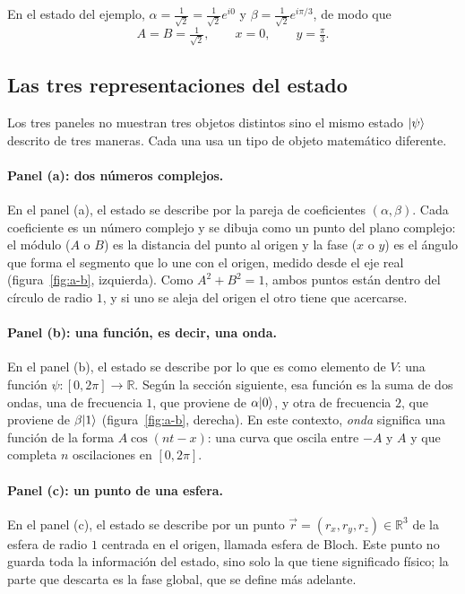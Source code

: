En el estado del ejemplo, $\alpha=\frac1{\sqrt2}=\frac1{\sqrt2}e^{i0}$ y
$\beta=\frac1{\sqrt2}e^{i\pi/3}$, de modo que
\[
  A=B=\tfrac1{\sqrt2},\qquad x=0,\qquad y=\tfrac\pi3 .
\]

\subsection*{Las tres representaciones del estado}

Los tres paneles no muestran tres objetos distintos sino el mismo estado $\lvert \psi\rangle$ descrito de
tres maneras. Cada una usa un tipo de objeto matemático diferente.

\paragraph{Panel (a): dos números complejos.}
En el panel (a), el estado se describe por la pareja de coeficientes $(\alpha,\beta)$. Cada
coeficiente es un número complejo y se dibuja como un punto del plano complejo: el módulo ($A$ o
$B$) es la distancia del punto al origen y la fase ($x$ o $y$) es el ángulo que forma el segmento
que lo une con el origen, medido desde el eje real (figura~\ref{fig:a-b}, izquierda). Como
$A^2+B^2=1$, ambos puntos están dentro del círculo de radio $1$, y si uno se aleja del origen el
otro tiene que acercarse.

\paragraph{Panel (b): una función, es decir, una onda.}
En el panel (b), el estado se describe por lo que es como elemento de $V$: una función
$\psi\colon[0,2\pi]\to\mathbb R$. Según la sección siguiente, esa función es la suma de dos
ondas, una de frecuencia $1$, que proviene de $\alpha\lvert 0\rangle$, y otra de frecuencia $2$, que
proviene de $\beta\lvert 1\rangle$ (figura~\ref{fig:a-b}, derecha). En este contexto, \emph{onda} significa
una función de la forma $A\cos(nt-x)$: una curva que oscila entre $-A$ y $A$ y que completa $n$
oscilaciones en $[0,2\pi]$.

\paragraph{Panel (c): un punto de una esfera.}
En el panel (c), el estado se describe por un punto $\vec r=(r_x,r_y,r_z)\in\mathbb R^3$ de la
esfera de radio $1$ centrada en el origen, llamada esfera de Bloch. Este punto no guarda toda la
información del estado, sino solo la que tiene significado físico; la parte que descarta es la
fase global, que se define más adelante.

